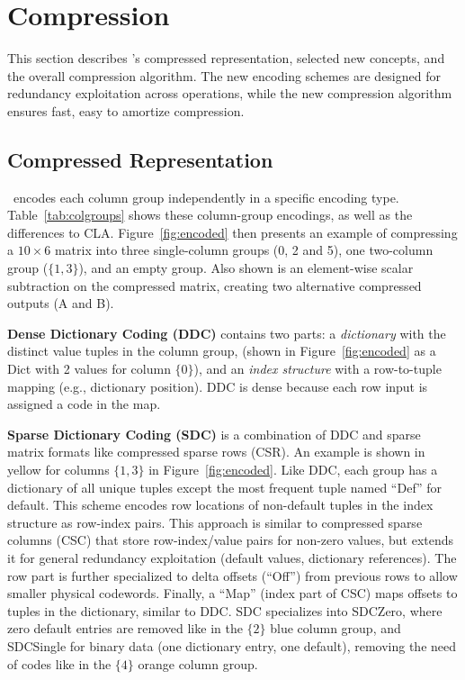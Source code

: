 
\section{Compression}
\label{sec:compression}

This section describes \name's compressed representation, selected new concepts, and the overall compression algorithm.
The new encoding schemes are designed for redundancy exploitation across operations, while the new compression algorithm ensures fast, easy to amortize compression.

\subsection{Compressed Representation}
\label{sec:compressedRepresentation}




\name\ encodes each column group independently in a specific encoding type.
Table~\ref{tab:colgroups} shows these column-group encodings, as well as the differences to CLA.
Figure~\ref{fig:encoded} then presents an example of compressing a $10\times 6$ matrix into three single-column groups (0, 2 and 5), one two-column group ($\{1,3\}$), and an empty group. Also shown is an element-wise scalar subtraction on the compressed matrix, creating two alternative compressed outputs (A and B).


\textbf{Dense Dictionary Coding (DDC)} contains two parts: a \emph{dictionary} with the distinct value tuples in the column group,
(shown in Figure~\ref{fig:encoded} as a Dict with 2 values for column $\{0\}$), and an \emph{index structure} with a row-to-tuple mapping (e.g., dictionary position). DDC is dense because each row input is assigned a code in the map.

\textbf{Sparse Dictionary Coding (SDC)}
is a combination of DDC and sparse matrix formats like compressed sparse rows (CSR).
An example is shown in yellow for columns $\{1,3\}$ in Figure~\ref{fig:encoded}. Like DDC, each group has a dictionary of all unique tuples except the most frequent tuple named ``Def'' for default. This scheme encodes row locations of non-default tuples in the index structure as row-index pairs. This approach is similar to compressed sparse columns (CSC) that store row-index/value pairs for non-zero values, but extends it for general redundancy exploitation (default values, dictionary references).
The row part is further specialized to delta offsets (``Off'') from previous rows to allow smaller physical codewords.
Finally, a ``Map'' (index part of CSC) maps offsets to tuples in the dictionary, similar to DDC.
SDC specializes into SDCZero, where zero default entries are removed like in the
$\{2\}$
blue column group, and SDCSingle for binary data (one dictionary entry, one default), removing the need of codes like in the
$\{4\}$
orange column group.

